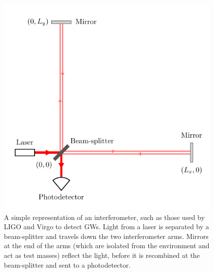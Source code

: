 \begin{figure}
    \centering
    \includegraphics[width=0.6\columnwidth]{Figures/Introduction/interferometer.pdf}
    \caption[Schematic diagram of an interferometer]{ 
    A simple representation of an interferometer, such as those used by LIGO and Virgo to detect GWs. Light from a laser is separated by a beam-splitter and travels down the two interferometer arms. Mirrors at the end of the arms (which are isolated from the environment and act as test masses) reflect the light, before it is recombined at the beam-splitter and sent to a photodetector.
    }
    \label{ch1:fig:interferometer}
\end{figure}

